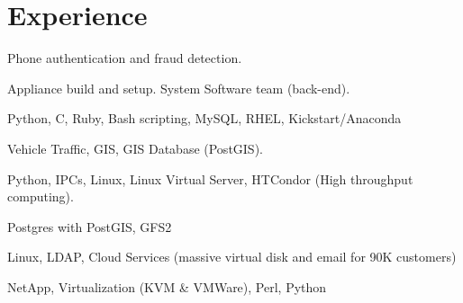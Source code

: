 \documentclass[letterpaper]{cvitae}
\begin{document}
\begin{minipage}[t]{0.66\textwidth}
\section{Experience}

\vspace{\topsep} %
\begin{tightitemize}
\item Phone authentication and fraud detection.
\item Appliance build and setup. System Software team (back-end).
\item Python, C, Ruby, Bash scripting, MySQL, RHEL, Kickstart/Anaconda
\end{tightitemize}

\sectionspace

\begin{tightitemize}
\item Vehicle Traffic, GIS, GIS Database (PostGIS).
\item Python, IPCs, Linux, Linux Virtual Server, HTCondor (High throughput computing).
\item Postgres with PostGIS, GFS2
\end{tightitemize}

\sectionspace

\vspace{\topsep} %
\begin{tightitemize}
\item Linux, LDAP, Cloud Services (massive virtual disk and email for 90K customers)
\item NetApp, Virtualization (KVM \& VMWare), Perl, Python
\end{tightitemize}

\sectionspace



\end{minipage}
\end{document}

